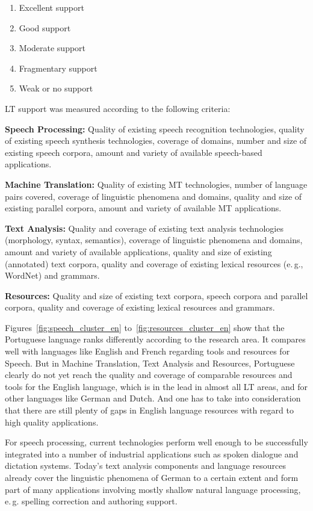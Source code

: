 \begin{multicols}{2}
\begin{enumerate}
\item Excellent support
\item Good support
\item Moderate support
\item Fragmentary support
\item Weak or no support
\end{enumerate}

LT support was measured according to the following criteria:

\textbf{Speech Processing:} Quality of existing speech recognition technologies, quality of existing speech synthesis technologies, coverage of domains, number and size of existing speech corpora, amount and variety of available speech-based applications.

\textbf{Machine Translation:} Quality of existing MT technologies, number of language pairs covered, coverage of linguistic phenomena and domains, quality and size of existing parallel corpora, amount and variety of available MT applications.

\textbf{Text Analysis:} Quality and coverage of existing text analysis technologies (morphology, syntax, semantics), coverage of linguistic phenomena and domains, amount and variety of available applications, quality and size of existing (annotated) text corpora, quality and coverage of existing lexical resources (e.\,g., WordNet) and grammars.

\textbf{Resources:} Quality and size of existing text corpora, speech corpora and parallel corpora, quality and coverage of existing lexical resources and grammars.

Figures~\ref{fig:speech_cluster_en} to~\ref{fig:resources_cluster_en} show that the Portuguese language ranks differently according to the research area. It compares well with languages like English and French regarding tools and resources for Speech. But in Machine Translation, Text Analysis and Resources, Portuguese clearly do not yet reach the quality and coverage of comparable resources and tools for the English language, which is in the lead in almost all LT areas, and for other languages like German and Dutch. And one has to take into consideration that there are still plenty of gaps in English language resources with regard to high quality applications.

For speech processing, current technologies perform well enough to be successfully integrated into a number of industrial applications such as spoken dialogue and dictation systems. Today’s text analysis components and language resources already cover the linguistic phenomena of German to a certain extent and form part of many applications involving mostly shallow natural language processing, e.\,g. spelling correction and authoring support.


\end{multicols}
